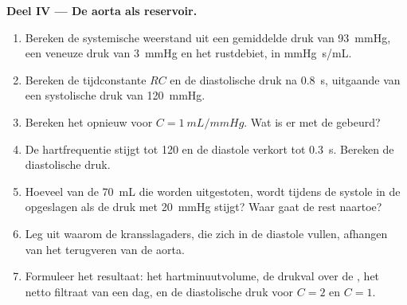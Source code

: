 \begin{problem}
\medskip
\noindent\textbf{Deel IV --- De aorta als reservoir.}
\begin{enumerate}[resume]
  \item Bereken de systemische weerstand uit een gemiddelde druk van
        \qty{93}{mmHg}, een veneuze druk van \qty{3}{mmHg} en het rustdebiet,
        in \unit{mmHg.s/mL}.
  \item Bereken de tijdconstante $RC$ en de diastolische druk na
        \qty{0.8}{s}, uitgaande van een systolische druk van \qty{120}{mmHg}.
  \item Bereken het opnieuw voor $C = \qty{1}{mL/mmHg}$. Wat is er met de
         gebeurd?
  \item De hartfrequentie stijgt tot \num{120} en de diastole verkort tot
        \qty{0.3}{s}. Bereken de diastolische druk.
  \item Hoeveel van de \qty{70}{mL} die worden uitgestoten, wordt tijdens de
        systole in de  opgeslagen als de druk met \qty{20}{mmHg}
        stijgt? Waar gaat de rest naartoe?
  \item Leg uit waarom de kransslagaders, die zich in de diastole vullen,
        afhangen van het terugveren van de aorta.
  \item Formuleer het resultaat: het hartminuutvolume, de drukval over de
        , het netto filtraat van een dag, en de diastolische druk
        voor $C = 2$ en $C = 1$.
\end{enumerate}
\end{problem}
